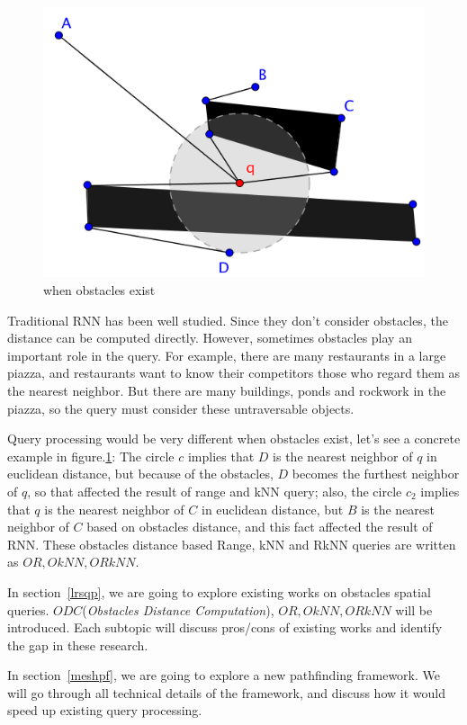\begin{figure}[htp]
  \centering
  \includegraphics[width=0.8\linewidth]{pic/obs_dis.PNG}
  \caption{when obstacles exist}
\label{obs_dis}
\end{figure}

Traditional RNN has been well studied. Since they don't consider obstacles, the distance can be computed directly.
However, sometimes obstacles play an important role in the query. For example, there are many
restaurants in a large piazza, and restaurants want to know their competitors those who regard
them as the nearest neighbor. But there are many buildings, ponds and
rockwork in the piazza, so the query must consider these untraversable objects.

Query processing would be very different when obstacles exist, let's see a concrete example in
figure.\ref{obs_dis}:
The circle $c$ implies that $D$ is the nearest neighbor of $q$ in euclidean
distance, but because of the obstacles, $D$ becomes the furthest neighbor of $q$, so that
affected the result of range and kNN query;
also, the circle $c_2$ implies that $q$ is the nearest neighbor of $C$ in euclidean distance,
but $B$ is the nearest neighbor of $C$ based on obstacles distance, and this fact affected the
result of RNN\@. These obstacles distance based Range, kNN and RkNN queries are written as
$\mathit{OR, OkNN, ORkNN}$.

In section~\ref{lrsqp}, we are going to explore existing works on obstacles spatial queries.
$\mathit{ODC}$(\textit{Obstacles Distance Computation}), $\mathit{OR, OkNN, ORkNN}$ will be introduced. Each
subtopic will discuss pros/cons of existing works and identify the gap in these research.

In section~\ref{meshpf}, we are going to explore a new pathfinding framework. We will go
through all technical details of the framework, and discuss how it would speed up existing query
processing.

